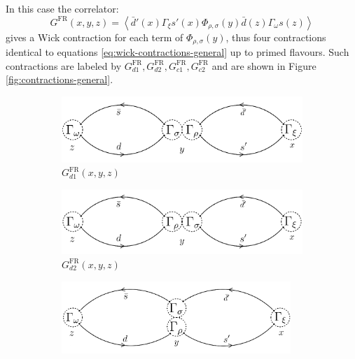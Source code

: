 \documentclass[english, LaM, oneside, noexaminfo]{sapthesis}
\newcommand{\la}{\langle}
\newcommand{\ra}{\rangle}
\begin{document}
In this case the correlator:
\begin{equation*}
    G^\text{FR}(x,y,z) = \left\la \bar d' (x) \Gamma_\xi s'(x) \Phi_{\rho,\sigma}(y) \bar d (z) \Gamma_\omega s(z) \right\ra
\end{equation*}
gives a Wick contraction for each term of $\Phi_{\rho,\sigma}(y)$, thus four contractions identical to equations \ref{eq:wick-contractions-general} up to primed flavours.
Such contractions are labeled by $G_{d1}^\text{FR}, G_{d2}^\text{FR}, G_{c1}^\text{FR}, G_{c2}^\text{FR}$ and are shown in Figure \ref{fig:contractions-general}.
\begin{figure}[h!]
    \centering
    \begin{subfigure}[b]{0.49\textwidth}
        \centering
        \includegraphics[width=\textwidth]{imgs-MSc-thesis/Wick_D1.png}
        \caption{$G_{d1}^\text{FR}(x,y,z)$}
    \end{subfigure}
    \begin{subfigure}[b]{0.49\textwidth}
        \centering
        \includegraphics[width=\textwidth]{imgs-MSc-thesis/Wick_D2.png}
        \caption{$G_{d2}^\text{FR}(x,y,z)$}
    \end{subfigure}
    \begin{subfigure}[b]{0.49\textwidth}
        \centering
        \includegraphics[width=0.95\textwidth]{imgs-MSc-thesis/Wick_C1.png}

\end{subfigure}
\end{figure}
\end{document}
